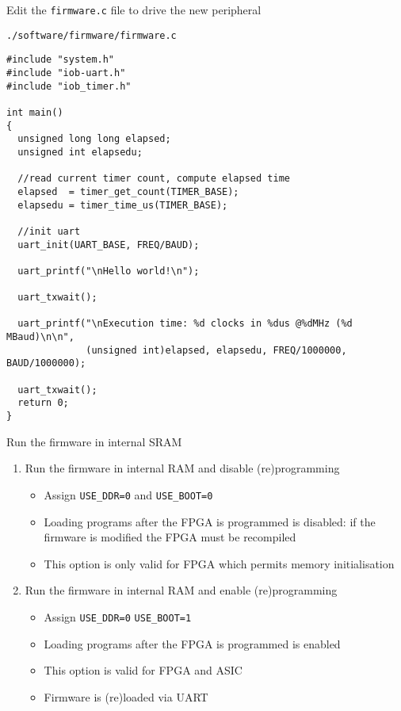 \documentclass [xcolor=svgnames, t] {beamer}
\begin{document}
\begin{frame}[fragile]{Edit the {\tt firmware.c} file to drive the new peripheral}

  {\tt ./software/firmware/firmware.c}
  \begin{tiny}
    \begin{lstlisting}
#include "system.h"
#include "iob-uart.h"
#include "iob_timer.h"

int main()
{
  unsigned long long elapsed;
  unsigned int elapsedu;

  //read current timer count, compute elapsed time
  elapsed  = timer_get_count(TIMER_BASE);
  elapsedu = timer_time_us(TIMER_BASE);

  //init uart 
  uart_init(UART_BASE, FREQ/BAUD);

  uart_printf("\nHello world!\n");
  
  uart_txwait();

  uart_printf("\nExecution time: %d clocks in %dus @%dMHz (%d MBaud)\n\n", 
              (unsigned int)elapsed, elapsedu, FREQ/1000000, BAUD/1000000);

  uart_txwait();
  return 0;
}
\end{lstlisting}
\end{tiny}
\end{frame}


\begin{frame}{Run the firmware in internal SRAM}
\begin{enumerate}
\item Run the firmware in internal RAM and disable (re)programming
  \begin{itemize}
  \item Assign {\tt USE\_DDR=0} and {\tt USE\_BOOT=0}
  \item Loading programs after the FPGA is programmed is disabled: if the firmware is modified the FPGA must be recompiled
  \item This option is only valid for FPGA which permits memory initialisation
  \end{itemize}
\item Run the firmware in internal RAM and enable (re)programming
  \begin{itemize}
  \item Assign {\tt USE\_DDR=0} {\tt USE\_BOOT=1}
  \item Loading programs after the FPGA is programmed is enabled
  \item This option is valid for FPGA and ASIC
  \item Firmware is (re)loaded via UART
  \end{itemize}
\end{enumerate}
\end{frame}
\end{document}
